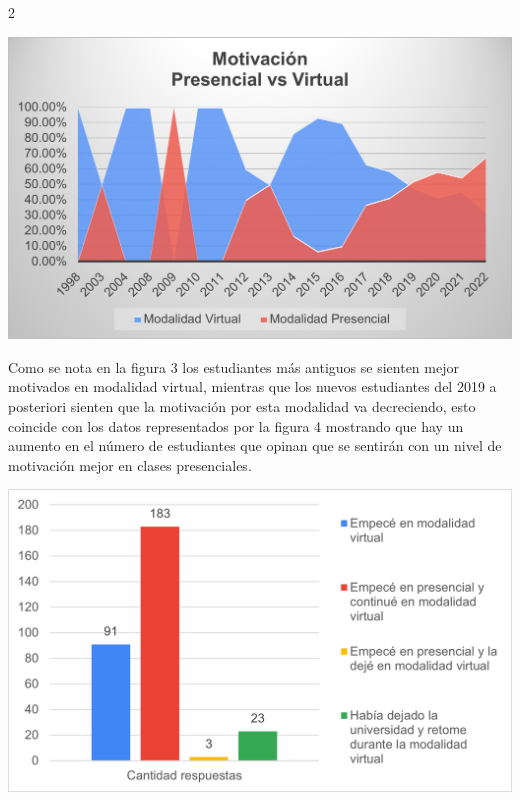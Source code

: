 \documentclass[12pt,spanish,Letterpaper,openany]{book}
\begin{document}
\begin {multicols}{2}
\begin {flushleft}
\begin{minipage}[c]{\columnwidth}
\includegraphics[width=1\linewidth]{images/pareja19_image5}

\end{minipage}
\end {flushleft}

Como se nota en la figura 3 los estudiantes más antiguos se sienten mejor motivados en modalidad virtual, mientras que los nuevos estudiantes del 2019 a posteriori sienten que la motivación por esta modalidad va decreciendo, esto coincide con los datos representados por la figura 4 mostrando que hay un aumento en el número de estudiantes que opinan que se sentirán con un nivel de motivación mejor en clases presenciales.

\begin {flushleft}
\noindent\begin{minipage}[c]{\columnwidth}
\centering

\includegraphics[width=1\linewidth]{images/pareja19_image6}


\end{minipage}
\end{flushleft}
\end{multicols}
\end{document}
